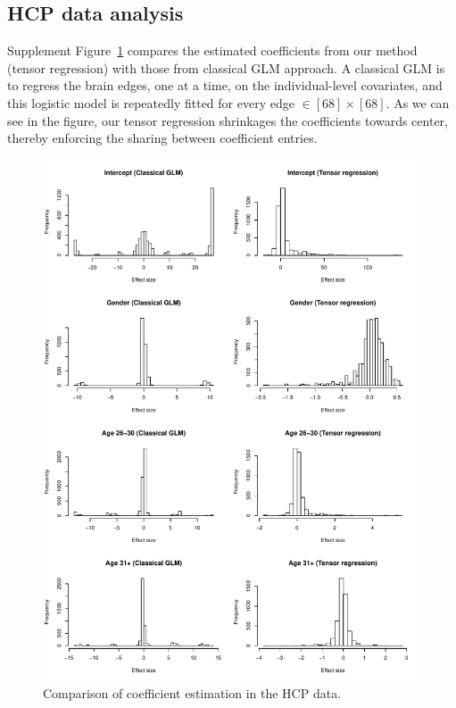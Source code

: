 \documentclass[11pt]{article}
\theoremstyle{plain}
\theoremstyle{definition}
\begin{document}
\subsection{HCP data analysis}


Supplement Figure~\ref{fig:s1} compares the estimated coefficients from our method (tensor regression) with those from classical GLM approach. A classical GLM is to regress the brain edges, one at a time, on the individual-level covariates, and this logistic model is repeatedly fitted for every edge $\in [68]\times [68]$. As we can see in the figure, our tensor regression shrinkages the coefficients towards center, thereby enforcing the sharing between coefficient entries. 

\begin{figure}[ht]
\includegraphics[width=17cm]{compare.pdf}
\caption{Comparison of coefficient estimation in the HCP data.}\label{fig:s1}
\end{figure}
\end{document}
